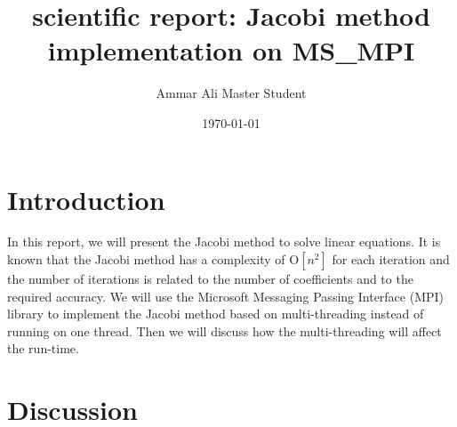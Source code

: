 \documentclass[preprint,pre,floats,aps,amsmath,amssymb]{revtex4}
\begin{document}
\title{scientific report: Jacobi method implementation on MS\_MPI 
}
\author{Ammar Ali Master Student}
\date{\today}




\maketitle

\section{Introduction}
\label{sec:intro}
In this report, we will present the Jacobi method to solve linear equations. It is known that the Jacobi method has a complexity of O$[n^2]$ for each iteration and the number of iterations is related to the number of coefficients and to the required accuracy. We will use the Microsoft Messaging Passing Interface (MPI) library to implement the Jacobi method based on multi-threading instead of running on one thread. Then we will discuss how the multi-threading will affect the run-time.


\section{Discussion}
	\label{sec:Discussion}
\end{document}
